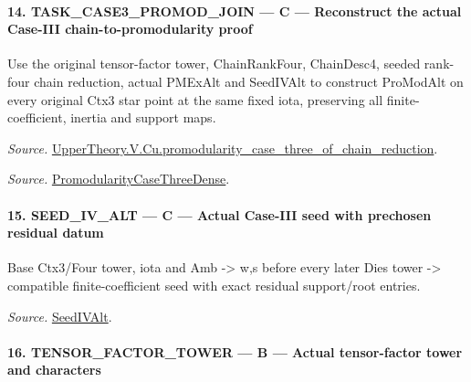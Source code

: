 \documentclass[11pt,a4paper]{article}
\numberwithin{equation}{section}
\theoremstyle{remark}\newtheorem{remark}[theorem]{Remark}
\begin{document}
\paragraph{14. TASK\_\allowbreak CASE3\_\allowbreak PROMOD\_\allowbreak JOIN — C — Reconstruct the actual Case-III chain-to-promodularity proof}

Use the original tensor-factor tower, ChainRankFour, ChainDesc4, seeded rank-four chain reduction, actual PMExAlt and SeedIVAlt to construct ProModAlt on every original Ctx3 star point at the same fixed iota, preserving all finite-coefficient, inertia and support maps.

\emph{Source.} \href{https://github.com/CocoSgt/riemann-hypothesis-lean/blob/7cbf7a0c32fca1badf05931879a37c3f8a2b03b4/src/Development/AutomorphicArithmetic/AutomorphicVarieties/ModularityArgument/ThresholdArguments/DenseThresholdCases/PromodularityCaseThreeOfLemmas.lean#L131-L153}{UpperTheory.V.Cu.promodularity\_\allowbreak case\_\allowbreak three\_\allowbreak of\_\allowbreak chain\_\allowbreak reduction}.

\emph{Source.} \href{https://github.com/CocoSgt/riemann-hypothesis-lean/blob/7cbf7a0c32fca1badf05931879a37c3f8a2b03b4/src/Development/AutomorphicArithmetic/AutomorphicVarieties/ModularityArgument/ThresholdArguments/DenseThresholdCases/PromodularityCaseThree.lean#L40-L42}{PromodularityCaseThreeDense}.



\paragraph{15. SEED\_\allowbreak IV\_\allowbreak ALT — C — Actual Case-III seed with prechosen residual datum}

Base Ctx3/Four tower, iota and Amb -> w,s before every later Dies tower -> compatible finite-coefficient seed with exact residual support/root entries.

\emph{Source.} \href{https://github.com/CocoSgt/riemann-hypothesis-lean/blob/7cbf7a0c32fca1badf05931879a37c3f8a2b03b4/src/Development/AutomorphicArithmetic/AutomorphicVarieties/ModularityArgument/ThresholdArguments/DenseThresholdCases/PromodularityCaseThree.lean#L19-L25}{SeedIVAlt}.



\paragraph{16. TENSOR\_\allowbreak FACTOR\_\allowbreak TOWER — B — Actual tensor-factor tower and characters}
\end{document}
